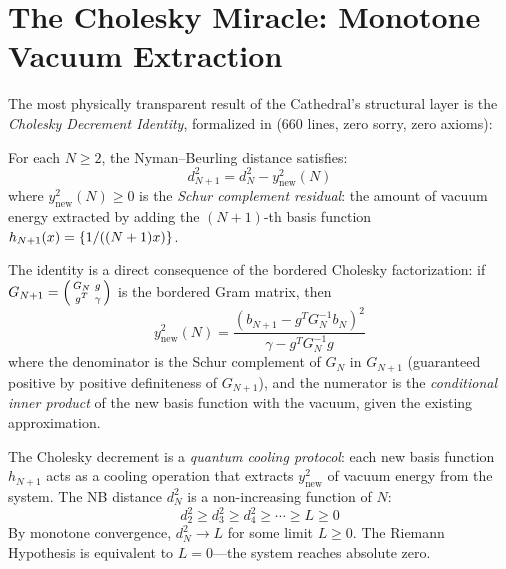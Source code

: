 \section{The Cholesky Miracle: Monotone Vacuum Extraction}
\label{sec:cholesky}

The most physically transparent result of the Cathedral's structural
layer is the \emph{Cholesky Decrement Identity}, formalized in
 (660 lines, zero sorry, zero axioms):

\begin{theorem}
\label{thm:cholesky}
For each $N \geq 2$, the Nyman--Beurling distance satisfies:
\[
  d^2_{N+1} = d^2_N - y^2_{\mathrm{new}}(N)
\]
where $y^2_{\mathrm{new}}(N) \geq 0$ is the \emph{Schur complement
residual}: the amount of vacuum energy extracted by adding the
$(N+1)$-th basis function $h_{N+1}(x) = \{1/((N+1)x)\}$.
\end{theorem}

The identity is a direct consequence of the bordered Cholesky
factorization: if $G_{N+1} = \begin{psmallmatrix} G_N & g \\ g^T & \gamma \end{psmallmatrix}$
is the bordered Gram matrix, then
\[
  y^2_{\mathrm{new}}(N)
  = \frac{(b_{N+1} - g^T G_N^{-1} b_N)^2}{\gamma - g^T G_N^{-1} g}
\]
where the denominator is the Schur complement of $G_N$ in $G_{N+1}$
(guaranteed positive by positive definiteness of $G_{N+1}$),
and the numerator is the \emph{conditional inner product} of the new
basis function with the vacuum, given the existing approximation.

\begin{principle}
\label{princ:cooling}
The Cholesky decrement is a \emph{quantum cooling protocol}: each new
basis function $h_{N+1}$ acts as a cooling operation that extracts
$y^2_{\mathrm{new}}$ of vacuum energy from the system. The NB distance
$d^2_N$ is a non-increasing function of $N$:
\[
  d^2_2 \geq d^2_3 \geq d^2_4 \geq \cdots \geq L \geq 0
\]
By monotone convergence, $d^2_N \to L$ for some limit $L \geq 0$.
The Riemann Hypothesis is equivalent to $L = 0$---the system reaches
absolute zero.
\end{principle}

